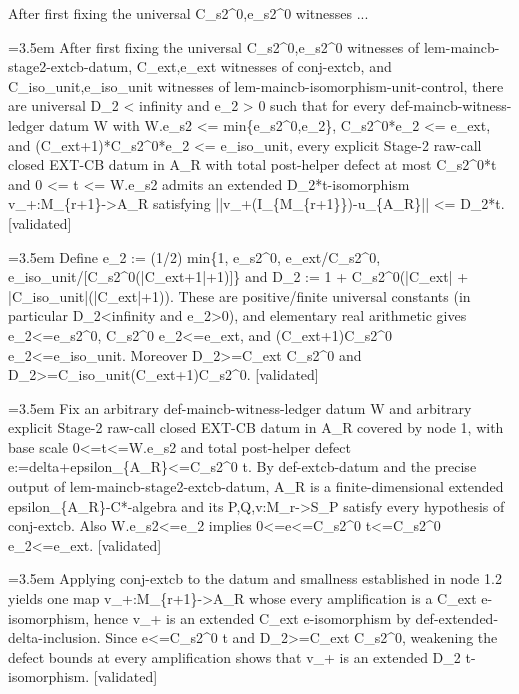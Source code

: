 \documentclass{article}
\newcommand{\step}[1]{\par\noindent\hangindent=3.5em\hangafter=1%
  \makebox[3.5em][l]{\textbf{#1.}}}
\newcommand{\steptag}[1]{\hfill{\small\textsf{[#1]}}}
\begin{document}
\begin{proofbox}{After first fixing the universal C\_s2\textasciicircum{}0,e\_s2\textasciicircum{}0 witnesses ...}
\step{1} After first fixing the universal C\_s2\textasciicircum{}0,e\_s2\textasciicircum{}0 witnesses of lem-maincb-stage2-extcb-datum, C\_ext,e\_ext witnesses of conj-extcb, and C\_iso\_unit,e\_iso\_unit witnesses of lem-maincb-isomorphism-unit-control, there are universal D\_2 < infinity and e\_2 > 0 such that for every def-maincb-witness-ledger datum W with W.e\_s2 <= min\{e\_s2\textasciicircum{}0,e\_2\}, C\_s2\textasciicircum{}0*e\_2 <= e\_ext, and (C\_ext+1)*C\_s2\textasciicircum{}0*e\_2 <= e\_iso\_unit, every explicit Stage-2 raw-call closed EXT-CB datum in A\_R with total post-helper defect at most C\_s2\textasciicircum{}0*t and 0 <= t <= W.e\_s2 admits an extended D\_2*t-isomorphism v\_+:M\_\{r+1\}->A\_R satisfying ||v\_+(I\_\{M\_\{r+1\}\})-u\_\{A\_R\}|| <= D\_2*t. \steptag{validated} \\[6pt]
\step{1.1} Define e\_2 := (1/2) min\{1, e\_s2\textasciicircum{}0, e\_ext/C\_s2\textasciicircum{}0, e\_iso\_unit/[C\_s2\textasciicircum{}0(|C\_ext+1|+1)]\} and D\_2 := 1 + C\_s2\textasciicircum{}0(|C\_ext| + |C\_iso\_unit|(|C\_ext|+1)). These are positive/finite universal constants (in particular D\_2<infinity and e\_2>0), and elementary real arithmetic gives e\_2<=e\_s2\textasciicircum{}0, C\_s2\textasciicircum{}0 e\_2<=e\_ext, and (C\_ext+1)C\_s2\textasciicircum{}0 e\_2<=e\_iso\_unit. Moreover D\_2>=C\_ext C\_s2\textasciicircum{}0 and D\_2>=C\_iso\_unit(C\_ext+1)C\_s2\textasciicircum{}0. \steptag{validated} \\[4pt]
\step{1.2} Fix an arbitrary def-maincb-witness-ledger datum W and arbitrary explicit Stage-2 raw-call closed EXT-CB datum in A\_R covered by node 1, with base scale 0<=t<=W.e\_s2 and total post-helper defect e:=delta+epsilon\_\{A\_R\}<=C\_s2\textasciicircum{}0 t. By def-extcb-datum and the precise output of lem-maincb-stage2-extcb-datum, A\_R is a finite-dimensional extended epsilon\_\{A\_R\}-C*-algebra and its P,Q,v:M\_r->S\_P satisfy every hypothesis of conj-extcb. Also W.e\_s2<=e\_2 implies 0<=e<=C\_s2\textasciicircum{}0 t<=C\_s2\textasciicircum{}0 e\_2<=e\_ext. \steptag{validated} \\[4pt]
\step{1.3} Applying conj-extcb to the datum and smallness established in node 1.2 yields one map v\_+:M\_\{r+1\}->A\_R whose every amplification is a C\_ext e-isomorphism, hence v\_+ is an extended C\_ext e-isomorphism by def-extended-delta-inclusion. Since e<=C\_s2\textasciicircum{}0 t and D\_2>=C\_ext C\_s2\textasciicircum{}0, weakening the defect bounds at every amplification shows that v\_+ is an extended D\_2 t-isomorphism. \steptag{validated} \\[4pt]

\end{proofbox}
\end{document}
